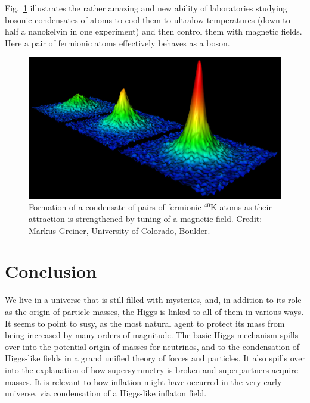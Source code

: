 \documentclass[12pt]{iopart}
\begin{document}
Fig.~\ref{Fig22-BEC.eps} illustrates the rather amazing and new ability of laboratories studying bosonic condensates of atoms to cool them to ultralow temperatures (down to half a nanokelvin in one experiment) and then control them with magnetic fields. Here a pair of fermionic atoms effectively behaves as a boson.
\begin{figure}[htbp]
\centering
\includegraphics[bb=0 0 360 250, width=5in]{Fig22-BEC.eps}
\caption{Formation of a condensate of pairs of fermionic $^{40}$K atoms as their attraction is strengthened by tuning of a magnetic field. Credit: Markus Greiner, University of Colorado, Boulder. 
\label{Fig22-BEC.eps}}
\end{figure}

\section{\label{sec:sec6} Conclusion}

We live in a universe that is still filled with mysteries, and, in addition to its role as the origin of particle masses, the Higgs is linked to all of them in various ways. It seems to point to susy, as the most natural agent to protect its mass from being increased by many orders of magnitude. The basic Higgs mechanism spills over into the potential origin of masses for neutrinos, and to the condensation of Higgs-like fields in a grand unified theory of forces and particles. It also spills over into the explanation of how supersymmetry is broken and superpartners acquire masses. It is relevant to how inflation might have occurred in the very early universe, via condensation of a Higgs-like inflaton field. 
\end{document}
